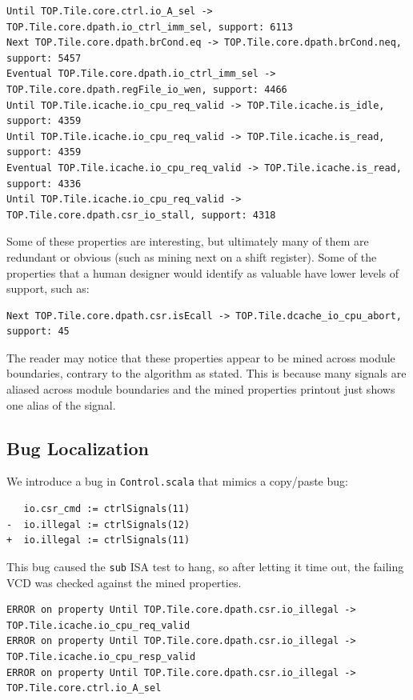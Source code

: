 \documentclass[acmlarge,11pt]{acmart}
\begin{document}
\begin{verbatim}
Until TOP.Tile.core.ctrl.io_A_sel -> TOP.Tile.core.dpath.io_ctrl_imm_sel, support: 6113
Next TOP.Tile.core.dpath.brCond.eq -> TOP.Tile.core.dpath.brCond.neq, support: 5457
Eventual TOP.Tile.core.dpath.io_ctrl_imm_sel -> TOP.Tile.core.dpath.regFile_io_wen, support: 4466
Until TOP.Tile.icache.io_cpu_req_valid -> TOP.Tile.icache.is_idle, support: 4359
Until TOP.Tile.icache.io_cpu_req_valid -> TOP.Tile.icache.is_read, support: 4359
Eventual TOP.Tile.icache.io_cpu_req_valid -> TOP.Tile.icache.is_read, support: 4336
Until TOP.Tile.icache.io_cpu_req_valid -> TOP.Tile.core.dpath.csr_io_stall, support: 4318
\end{verbatim}

Some of these properties are interesting, but ultimately many of them are redundant or obvious (such as mining next on a shift register).
Some of the properties that a human designer would identify as valuable have lower levels of support, such as:

\begin{verbatim}
Next TOP.Tile.core.dpath.csr.isEcall -> TOP.Tile.dcache_io_cpu_abort, support: 45
\end{verbatim}

The reader may notice that these properties appear to be mined across module boundaries, contrary to the algorithm as stated.
This is because many signals are aliased across module boundaries and the mined properties printout just shows one alias of the signal.

\subsection{Bug Localization}
We introduce a bug in \texttt{Control.scala} that mimics a copy/paste bug:
\begin{verbatim}
   io.csr_cmd := ctrlSignals(11)
-  io.illegal := ctrlSignals(12)
+  io.illegal := ctrlSignals(11)
\end{verbatim}
This bug caused the \texttt{sub} ISA test to hang, so after letting it time out, the failing VCD was checked against the mined properties.
\begin{verbatim}
ERROR on property Until TOP.Tile.core.dpath.csr.io_illegal -> TOP.Tile.icache.io_cpu_req_valid
ERROR on property Until TOP.Tile.core.dpath.csr.io_illegal -> TOP.Tile.icache.io_cpu_resp_valid
ERROR on property Until TOP.Tile.core.dpath.csr.io_illegal -> TOP.Tile.core.ctrl.io_A_sel
\end{verbatim}
\end{document}
